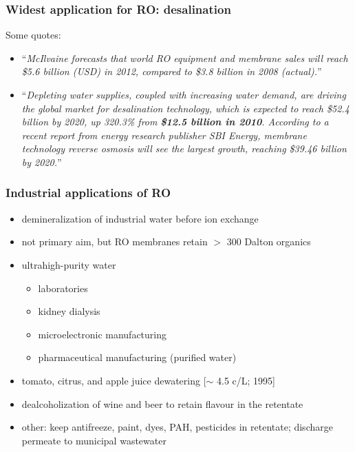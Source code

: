 \begin{frame}\frametitle{Widest application for RO: desalination}
	Some quotes:
	\begin{itemize}
		\item	``\emph{McIlvaine forecasts that world RO equipment and membrane sales will reach \$5.6 billion (USD) in 2012, compared to \$3.8 billion in 2008 (actual).}''
		\item	``\emph{Depleting water supplies, coupled with increasing water demand, are driving the global market for desalination technology, which is expected to reach \$52.4 billion by 2020, up 320.3\% from \textbf{\$12.5 billion in 2010}. According to a recent report from energy research publisher SBI Energy, membrane technology reverse osmosis will see the largest growth, reaching \$39.46 billion by 2020.}''
	\end{itemize}
\end{frame}

\begin{frame}\frametitle{Industrial applications of RO}
	\begin{itemize}
		\item	demineralization of industrial water before ion exchange
		\item	not primary aim, but RO membranes retain $>$ 300 Dalton organics %
		\item	ultrahigh-purity water
		 	\begin{itemize}
		 		\item	laboratories
		 		\item	kidney dialysis
		 		\item	microelectronic manufacturing
		 		\item	pharmaceutical manufacturing (purified water)
		 	\end{itemize}
		 \item	tomato, citrus, and apple juice dewatering [$\sim$ 4.5 c/L; 1995]
		 \item	dealcoholization of wine and beer to retain flavour in the retentate
		 \item	other: keep antifreeze, paint, dyes, PAH, pesticides in retentate; discharge permeate to municipal wastewater
	\end{itemize}
\end{frame}

